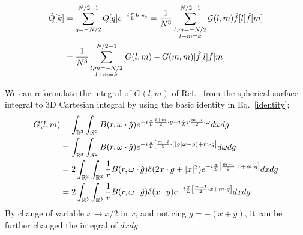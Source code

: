 \documentclass[11pt]{amsart}
\begin{document}
\color{blue}
\begin{align*}\begin{split}
\hat Q[k] &=  \sum_{q=-N/2}^{N/2-1} Q[q]e^{-i{\pi \over L}k\cdot v_q}=   \frac{1}{N^3} \sum_{\substack{l,m= -N/2 \\ l+m = k}}^{N/2-1}\mathcal{G}(l,m)\hat f[l] \hat f[m]  \\
&= \frac{1}{N^3} \sum_{\substack{l,m= -N/2 \\ l+m = k}}^{N/2-1} [G(l,m) - G(m,m)]\hat f[l] \hat f[m]
\end{split}\end{align*}
\color{black}

We can reformulate the integral of $G(l,m)$ of Ref.~ \cite{gambaFastSpectralMethod2017} from the spherical surface integral to 3D Cartesian integral by using the basic identity in Eq.~\eqref{identity};
\begin{align*}
\begin{split}
G(l,m)  &= \int_{\mathbb{R}^3} \int_{\mathcal{S}^2}   B(r,\omega \cdot \hat g)  e^{-i{\pi \over L} \frac{l+m}{2} \cdot g -i {\pi \over L} r \frac{m-l}{2}\cdot \omega}d\omega dg \\
&= \int_{\mathbb{R}^3} \int_{\mathcal{S}^2}   B(r,\omega \cdot \hat g)  e^{-i\frac{\pi}{L}\left[\frac{m-l}{2}\cdot (|g|\omega - g) + m\cdot g\right]} d\omega dg \\
&= 2\int_{\mathbb{R}^3}\int_{\mathbb{R}^3} {1\over r} B(r,\omega \cdot \hat g)  \delta(2x\cdot g + |x|^2) e^{-i\frac{\pi}{L}\left[\frac{m-l}{2}\cdot x + m\cdot g\right]} dx dg \\
&= 2\int_{\mathbb{R}^3}\int_{\mathbb{R}^3}{1\over r} B(r,\omega \cdot \hat g)  \delta(x\cdot y) e^{-i\frac{\pi}{L}\left[\frac{m-l}{2}\cdot x + m\cdot g\right]} dx dg \\
\end{split}
\end{align*}
By change of variable $x \to x/2$ in $x$, and noticing $g = -(x+y)$, it can be further changed the integral of $dxdy$: 
\end{document}
